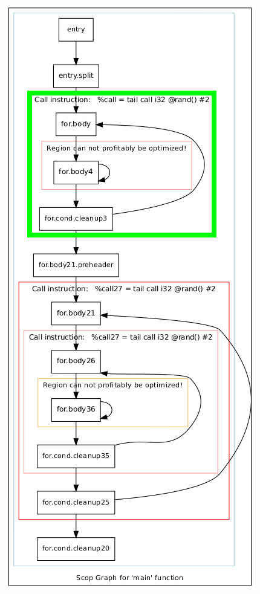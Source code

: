 \documentclass[aspectratio=169, xcolor=dvipsnames]{beamer}
\begin{document}
{\begin{frame}
        \vspace*{-1.5cm}
        \centering
        \includegraphics[height=1.2\textheight]{gfx/matmulScops(2).png}
    \end{frame}
    \begin{frame}
        \vspace*{-1.5cm}
        \centering

\end{frame}}
\end{document}
